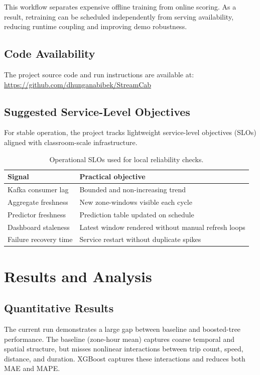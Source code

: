 \documentclass[conference]{IEEEtran}
\begin{document}
This workflow separates expensive offline training from online scoring. As a result, retraining can be scheduled independently from serving availability, reducing runtime coupling and improving demo robustness.

\subsection{Code Availability}
The project source code and run instructions are available at:
\href{https://github.com/dhunganabibek/StreamCab}{https://github.com/dhunganabibek/StreamCab}

\subsection{Suggested Service-Level Objectives}
For stable operation, the project tracks lightweight service-level objectives (SLOs) aligned with classroom-scale infrastructure.

\begin{table}[!t]
\centering
\begin{tabular}{ll}
\toprule
Signal & Practical objective \\
\midrule
Kafka consumer lag & Bounded and non-increasing trend \\
Aggregate freshness & New zone-windows visible each cycle \\
Predictor freshness & Prediction table updated on schedule \\
Dashboard staleness & Latest window rendered without manual refresh loops \\
Failure recovery time & Service restart without duplicate spikes \\
\bottomrule
\end{tabular}
\caption{Operational SLOs used for local reliability checks.}\label{tab:slo_targets}
\end{table}

\section{Results and Analysis}
\subsection{Quantitative Results}
The current run demonstrates a large gap between baseline and boosted-tree performance. The baseline (zone-hour mean) captures coarse temporal and spatial structure, but misses nonlinear interactions between trip count, speed, distance, and duration. XGBoost captures these interactions and reduces both MAE and MAPE\@.
\end{document}
